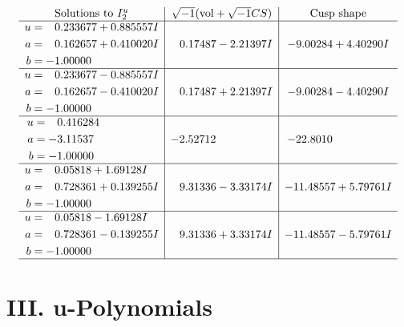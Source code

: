 \documentclass[1p]{elsarticle_modified}
\theoremstyle{definition}
\newcommand{\I}{\sqrt{-1}}
\begin{document}
$$\begin{array}{c|c|c}  
\text{Solutions to }I^u_{2}& \I (\text{vol} + \sqrt{-1}CS) & \text{Cusp shape}\\
 \hline 
\begin{aligned}
u &= \phantom{-}0.233677 + 0.885557 I \\
a &= \phantom{-}0.162657 + 0.410020 I \\
b &= -1.00000\phantom{ +0.000000I}\end{aligned}
 & \phantom{-}0.17487 - 2.21397 I & -9.00284 + 4.40290 I \\ \hline\begin{aligned}
u &= \phantom{-}0.233677 - 0.885557 I \\
a &= \phantom{-}0.162657 - 0.410020 I \\
b &= -1.00000\phantom{ +0.000000I}\end{aligned}
 & \phantom{-}0.17487 + 2.21397 I & -9.00284 - 4.40290 I \\ \hline\begin{aligned}
u &= \phantom{-}0.416284\phantom{ +0.000000I} \\
a &= -3.11537\phantom{ +0.000000I} \\
b &= -1.00000\phantom{ +0.000000I}\end{aligned}
 & -2.52712\phantom{ +0.000000I} & -22.8010\phantom{ +0.000000I} \\ \hline\begin{aligned}
u &= \phantom{-}0.05818 + 1.69128 I \\
a &= \phantom{-}0.728361 + 0.139255 I \\
b &= -1.00000\phantom{ +0.000000I}\end{aligned}
 & \phantom{-}9.31336 - 3.33174 I & -11.48557 + 5.79761 I \\ \hline\begin{aligned}
u &= \phantom{-}0.05818 - 1.69128 I \\
a &= \phantom{-}0.728361 - 0.139255 I \\
b &= -1.00000\phantom{ +0.000000I}\end{aligned}
 & \phantom{-}9.31336 + 3.33174 I & -11.48557 - 5.79761 I\\
 \hline 
 \end{array}$$\newpage
\newpage\renewcommand{\arraystretch}{1}
\centering \section*{ III. u-Polynomials}
\end{document}
